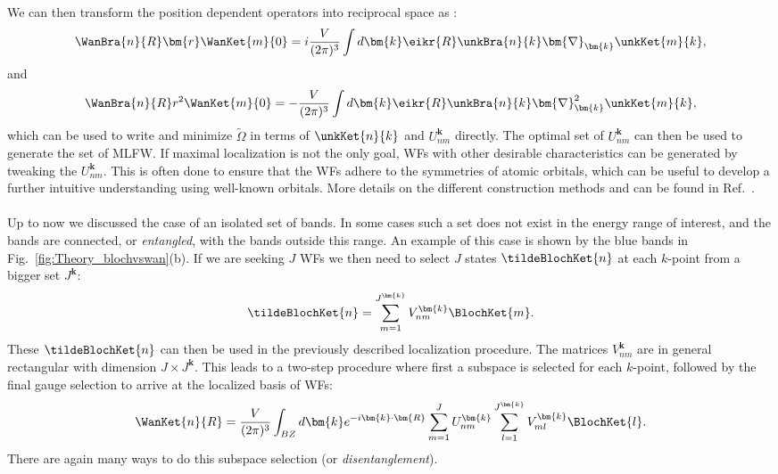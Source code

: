 We can then transform the position dependent operators into reciprocal space as \cite{Blount1962}:
\begin{equation}
\WanBra{n}{R}\bm{r}\WanKet{m}{0} = i \frac{V}{(2\pi)^3}\int d\bm{k} \eikr{R}\unkBra{n}{k} \bm{\nabla}_{\bm{k}} \unkKet{m}{k},
\end{equation}
and
\begin{equation}
\WanBra{n}{R}r^2\WanKet{m}{0} = -\frac{V}{(2\pi)^3}\int d\bm{k} \eikr{R}\unkBra{n}{k} \bm{\nabla}_{\bm{k}}^2 \unkKet{m}{k},
\end{equation}
which can be used to write and minimize $\tilde\Omega$ in terms of $\unkKet{n}{k}$ and $U_{nm}^{\bm{k}}$ directly.
The optimal set of $U_{nm}^{\bm{k}}$ can then be used to generate the set of MLFW.
If maximal localization is not the only goal, WFs with other desirable characteristics can be generated by tweaking the $U_{nm}^{\bm{k}}$.
This is often done to ensure that the WFs adhere to the symmetries of atomic orbitals, which can be useful to develop a further intuitive understanding using well-known orbitals.
More details on the different construction methods and can be found in Ref.~\cite{Marzari2012}.
\\\\
Up to now we discussed the case of an isolated set of bands. In some cases such a set does not exist in the energy range of interest, and the bands are connected, or {\it entangled}, with the bands outside this range.
An example of this case is shown by the blue bands in Fig.~\ref{fig:Theory_blochvswan}(b).
If we are seeking $J$ WFs we then need to select $J$ states $\tildeBlochKet{n}$ at each $k$-point from a bigger set $J^{\bm{k}}$:
\begin{equation}
	\tildeBlochKet{n} = \sum_{m=1}^{J^{\bm{k}}}V_{nm}^{\bm{k}} \BlochKet{m}.
\end{equation}
These $\tildeBlochKet{n}$ can then be used in the previously described localization procedure.
The matrices $V_{nm}^{\bm{k}}$ are in general rectangular with dimension $J\times J^{\bm{k}}$.
This leads to a two-step procedure where first a subspace is selected for each $k$-point, followed by the final gauge selection to arrive at the localized basis of WFs:
\begin{equation}
	\label{eq:Theory_fullwan}
	\WanKet{n}{R} = \frac{V}{(2\pi)^3} \int_{BZ} d\bm{k} e^{-i \bm{k} \cdot \bm{R}} \sum_{m=1}^J U^{\bm{k}}_{nm} \sum_{l=1}^{J^{\bm{k}}} V_{ml}^{\bm{k}} \BlochKet{l}.
\end{equation}
There are again many ways to do this subspace selection (or {\it disentanglement}).
